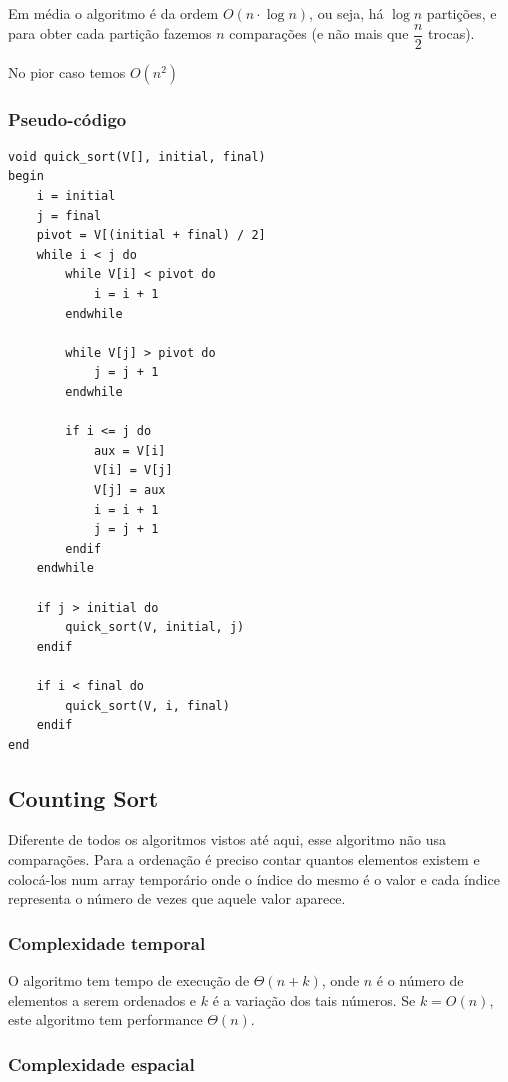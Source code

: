 Em média o algoritmo é da ordem $O(n \cdot \log n)$, ou seja, há
$\log n$ partições, e para obter cada partição fazemos $n$ comparações
(e não mais que $\dfrac{n}{2}$ trocas).

No pior caso temos $O(n^2)$

\subsubsection{Pseudo-código}

\begin{verbatim}
void quick_sort(V[], initial, final)
begin
    i = initial
    j = final
    pivot = V[(initial + final) / 2]
    while i < j do
        while V[i] < pivot do
            i = i + 1
        endwhile

        while V[j] > pivot do
            j = j + 1
        endwhile

        if i <= j do
            aux = V[i]
            V[i] = V[j]
            V[j] = aux
            i = i + 1
            j = j + 1
        endif
    endwhile

    if j > initial do
        quick_sort(V, initial, j)
    endif

    if i < final do
        quick_sort(V, i, final)
    endif
end
\end{verbatim}
\subsection{Counting Sort}

Diferente de todos os algoritmos vistos até aqui, esse algoritmo não usa
comparações. Para a ordenação é preciso contar quantos elementos existem
e colocá-los num array temporário onde o índice do mesmo é o valor e
cada índice representa o número de vezes que aquele valor aparece.

\subsubsection{Complexidade temporal}

O algoritmo tem tempo de execução de $\Theta(n + k)$, onde $n$ é o
número de elementos a serem ordenados e $k$ é a variação dos tais
números. Se $k = O(n)$, este algoritmo tem performance $\Theta(n)$.

\subsubsection{Complexidade espacial}

